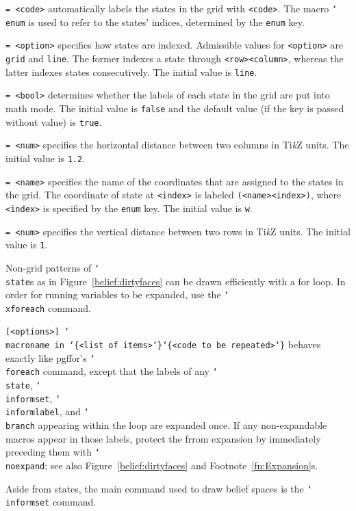 \documentclass{article}
\newenvironment{desc}{\itemize[leftmargin=50pt]}{\enditemize}
\def\macroarg#1#2{\item[\cmd{#1}] \hskip-2.5pt\texttt{#2}}
\def\option#1#2{\item[\texttt{#1}] \hskip-1.5pt\texttt{#2}}
\renewcommand{\textbackslash}{\char`\\}
\def\cmd#1{\texttt{\color{cmd}\textbackslash#1}}
\def\leftbrace{\char`\{}
\def\rightbrace{\char`\}}
\def\arg#1{{\color{cmd}\leftbrace}{\color{black}#1}{\color{cmd}\rightbrace}}
\def\optarg[#1]{{\color{player1}[#1]}}
\def\TikZ{Ti\emph{k}Z\xspace}
\begin{document}
\begin{desc}
\option{autolabel}{= <code>} automatically labels the states in the grid with \texttt{<code>}. The macro \cmd{enum} is used to refer to the states' indices, determined by the \texttt{enum} key.

\option{enum}{= <option>} specifies how states are indexed. Admissible values for \texttt{<option>} are \texttt{grid} and \texttt{line}. The former indexes a state through \texttt{<row><column>}, whereas the latter indexes states consecutively. The initial value is \texttt{line}.

\option{force math}{= <bool>} determines whether the labels of each state in the grid are put into math mode. The initial value is \texttt{false} and the default value (if the key is passed without value) is \texttt{true}.

\option{h}{= <num>} specifies the horizontal distance between two columns in  \TikZ units. The initial value is \texttt{1.2}.

\option{name}{= <name>} specifies the name of the coordinates that are assigned to the states in the grid. The coordinate of state at \texttt{<index>} is labeled \texttt{(<name><index>)}, where \texttt{<index>} is specified by the \texttt{enum} key. The initial value is \texttt{w}.

\option{v}{= <num>} specifies the vertical distance between two rows in \TikZ units. The initial value is \texttt{1}.
\end{desc}


\noindent Non-grid patterns of \cmd{state}s as in Figure~\ref{belief:dirtyfaces} can be drawn efficiently with a for loop. In order for running variables to be expanded, use the \cmd{xforeach} command.

\begin{desc}
\macroarg{xforeach}{\optarg[<options>] \cmd{macroname} in \arg{<list of items>}\arg{<code to be repeated>}} behaves exactly like pgffor's \cmd{foreach} command, except that the labels of any \cmd{state}, \cmd{informset}, \cmd{informlabel}, and \cmd{branch} appearing within the loop are expanded once. If any non-expandable macros appear in those labels, protect the frrom expansion by immediately preceding them with \cmd{noexpand}; see also Figure~\ref{belief:dirtyfaces} and Footnote~\ref{fn:Expansion}s.
\end{desc}

\noindent Aside from states, the main command used to draw belief spaces is the \cmd{informset} command.
\end{document}

